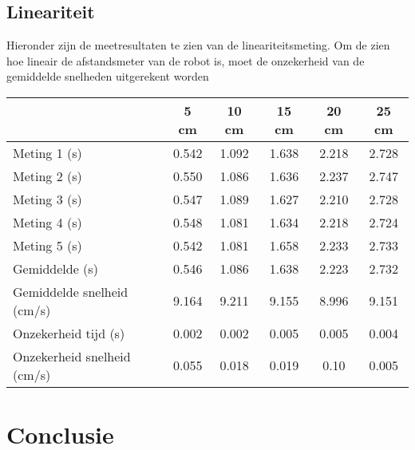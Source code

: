 \documentclass[12pt]{book}
\begin{document}
\subsection*{Lineariteit}
Hieronder zijn de meetresultaten te zien van de lineariteitsmeting. Om de zien hoe lineair de afstandsmeter van de robot is, moet de  onzekerheid van de gemiddelde snelheden uitgerekent worden
\begin{center}
\begin{tabular}{| l| c| c| c| c| c|}
\hline
   & 5 cm & 10 cm & 15 cm & 20 cm & 25 cm\\
\hline
   Meting 1 (s) & 0.542 & 1.092 & 1.638 & 2.218 & 2.728 \\
\hline
   Meting 2 (s) & 0.550 & 1.086 & 1.636 & 2.237 & 2.747 \\
\hline
   Meting 3 (s) & 0.547 & 1.089 & 1.627 & 2.210 & 2.728 \\
\hline
   Meting 4 (s) & 0.548 & 1.081 & 1.634 & 2.218 & 2.724 \\
\hline
   Meting 5 (s) & 0.542 & 1.081 & 1.658 & 2.233 & 2.733 \\
\hline
   Gemiddelde (s) & 0.546 & 1.086 & 1.638 & 2.223 & 2.732 \\
\hline
   Gemiddelde snelheid (cm/s) & 9.164 & 9.211 & 9.155 & 8.996 & 9.151 \\
\hline
   Onzekerheid tijd (s) & 0.002 & 0.002 & 0.005 & 0.005 & 0.004 \\
\hline
   Onzekerheid snelheid (cm/s) & 0.055 & 0.018 & 0.019 & 0.10 & 0.005 \\
\hline
 \end{tabular}
\end{center}
\section*{Conclusie}
\end{document}
